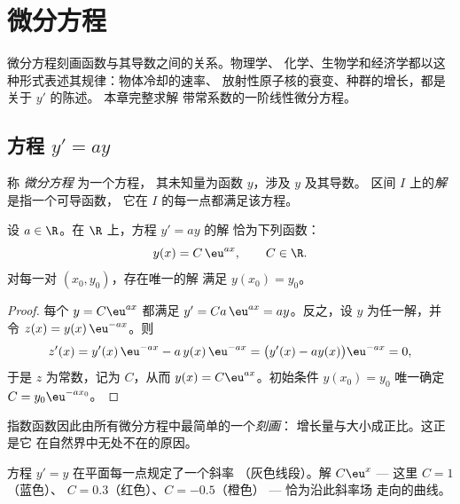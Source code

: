 \chapter{微分方程}\label{ch:g12:diffeq}

微分方程刻画函数与其导数之间的关系。物理学、
化学、生物学和经济学都以这种形式表述其规律：物体冷却的速率、
放射性原子核的衰变、种群的增长，都是关于 $y'$ 的陈述。
本章完整求解
带常系数的一阶线性微分方程。

\section{方程 \texorpdfstring{$y' = ay$}{y' = ay}}

\begin{definition}[微分方程]\label{def:g12:diffeq:ode}
称 \emph{微分方程} 为一个方程，
其未知量为函数 $y$，涉及 $y$ 及其导数。
区间 $I$ 上的\emph{解}是指一个可导函数，
它在 $I$ 的每一点都满足该方程。
\end{definition}

\begin{theorem}[$y' = ay$ 的解]\label{thm:g12:diffeq:homogeneous}
设 $a \in \R$。在 $\R$ 上，方程 $y' = ay$ 的解
恰为下列函数：
\[
y(x) = C\,\eu^{ax}, \qquad C \in \R .
\]
对每一对 $(x_0, y_0)$，存在唯一的解
满足 $y(x_0) = y_0$。
\end{theorem}

\begin{proof}
每个 $y = C\eu^{ax}$ 都满足 $y' = Ca\,\eu^{ax} = ay$。反之，设 $y$
为任一解，并令 $z(x) = y(x)\,\eu^{-ax}$。则
\[
z'(x) = y'(x)\,\eu^{-ax} - a\,y(x)\,\eu^{-ax}
= \bigl(y'(x) - a y(x)\bigr)\eu^{-ax} = 0,
\]
于是 $z$ 为常数，记为 $C$，从而 $y(x) = C\eu^{ax}$。初始条件
$y(x_0) = y_0$ 唯一确定 $C = y_0 \eu^{-a x_0}$。
\end{proof}

\begin{remark}
指数函数因此由所有微分方程中最简单的一个\emph{刻画}：
增长量与大小成正比。这正是它
在自然界中无处不在的原因。
\end{remark}

\begin{omfigure}

{\small 方程 $y' = y$ 在平面每一点规定了一个斜率
（灰色线段）。解 $C\eu^{x}$ --- 这里 $C = 1$（蓝色）、
$C = 0.3$（红色）、$C = -0.5$（橙色） --- 恰为沿此斜率场
走向的曲线。}
\end{omfigure}

